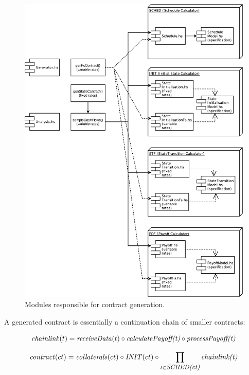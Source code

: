 \documentclass[runningheads]{llncs}
\newcommand{\ident}[1]{\mbox{\emph{#1}}}
\begin{document}
\begin{figure}
\includegraphics[width=1\textwidth]{images/modules} \caption{Modules responsible for contract generation.}
\label{fig1} 
\end{figure}

A generated contract is essentially a continuation chain of smaller contracts:

\noindent 
\begin{equation}
\ident{chainlink}(t)=\ident{receiveData}(t)\circ \ident{calculatePayoff(t)}\circ \ident{processPayoff(t)}
\end{equation}

\noindent 
\begin{equation}
\ident{contract}(ct)=\ident{collaterals}(ct)\circ \ident{INIT}(ct)\circ\prod_{\footnotesize t\in \ident{SCHED(ct)}}\ident{chainlink(t)}
\end{equation}
\end{document}
